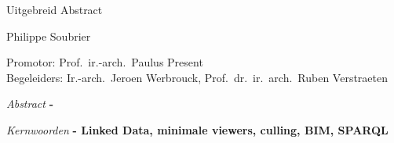 \begin{center}
    \sffamily
    \huge Uitgebreid Abstract

    \Large Philippe Soubrier

    \normalsize
    Promotor: Prof.\ ir.-arch.\ Paulus Present\\
    Begeleiders: Ir.-arch.\ Jeroen Werbrouck, Prof.\ dr.\ ir.\ arch.\ Ruben Verstraeten
\end{center}
\begin{multicols}{2}
    \small
    \emph{Abstract} \textbf{
        - \lipsum[1]
    }

    \emph{Kernwoorden} \textbf{
        - Linked Data, minimale viewers, culling, BIM, SPARQL
    }
    
    \lipsum[1-9]

\end{multicols}
\restoregeometry